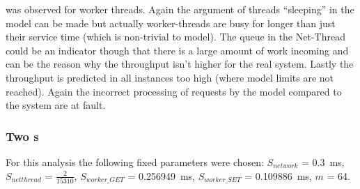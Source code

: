                 was observed for worker threads. Again the argument of threads ``sleeping'' in the model can be made
                but actually worker-threads are busy for longer than just their service time (which is non-trivial to
                model). The queue in the Net-Thread could be an indicator though that there is a large amount of work
                incoming and can be the reason why the throughput isn't higher for the real system. Lastly the
                throughput is predicted in all instances too high (where model limits are not reached). Again the
                incorrect processing of requests by the model compared to the system are at fault.

            \subsubsection{Two \mw{}s\label{subsubsec:7_noq_two-mws}}

                For this analysis the following fixed parameters were chosen: $S_{network}$ =
                \SI{0.3}{\milli\second}, $S_{netthread}$ = $\tfrac{2}{15310}$, $S_{worker\_GET}$ =
                \SI{0.256949}{\milli\second}, $S_{worker\_SET}$ = \SI{0.109886}{\milli\second}, $m$ = 64.

